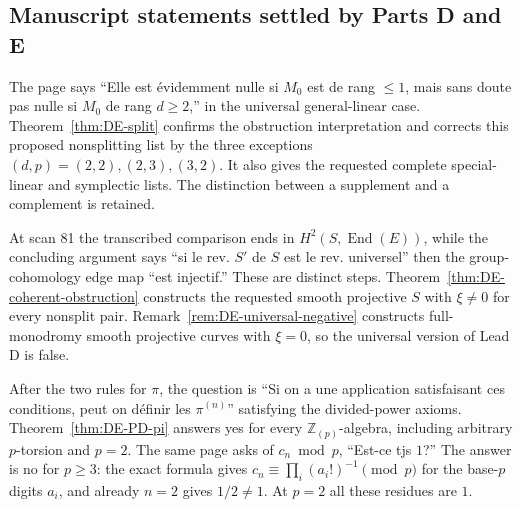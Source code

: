 \subsection{Manuscript statements settled by Parts D and E}

\begin{remark}\label{rem:DE-quote-D1}
The page says ``Elle est évidemment nulle si $M_0$ est de rang $\leq1$, mais sans doute pas nulle si $M_0$ de rang $d\geq2$,'' in the universal general-linear case.  Theorem~\ref{thm:DE-split} confirms the obstruction interpretation and corrects this proposed nonsplitting list by the three exceptions $(d,p)=(2,2),(2,3),(3,2)$.  It also gives the requested complete special-linear and symplectic lists.  The distinction between a supplement and a complement is retained.
\end{remark}

\begin{remark}\label{rem:DE-quote-D2}
At scan 81 the transcribed comparison ends in $H^2(S,\operatorname{End}(E))$, while the concluding argument says ``si le rev. $S'$ de $S$ est le rev. universel'' then the group-cohomology edge map ``est injectif.''  These are distinct steps.  Theorem~\ref{thm:DE-coherent-obstruction} constructs the requested smooth projective $S$ with $\xi\ne0$ for every nonsplit pair.  Remark~\ref{rem:DE-universal-negative} constructs full-monodromy smooth projective curves with $\xi=0$, so the universal version of Lead D is false.
\end{remark}

\begin{remark}\label{rem:DE-quote-E1}
After the two rules for $\pi$, the question is ``Si on a une application satisfaisant ces conditions, peut on définir les $\pi^{(n)}$'' satisfying the divided-power axioms.  Theorem~\ref{thm:DE-PD-pi} answers yes for every $\mathbb Z_{(p)}$-algebra, including arbitrary $p$-torsion and $p=2$.  The same page asks of $c_n\bmod p$, ``Est-ce tjs $1$?''  The answer is no for $p\geq3$: the exact formula gives $c_n\equiv\prod_i(a_i!)^{-1}\pmod p$ for the base-$p$ digits $a_i$, and already $n=2$ gives $1/2\ne1$.  At $p=2$ all these residues are $1$.
\end{remark}

